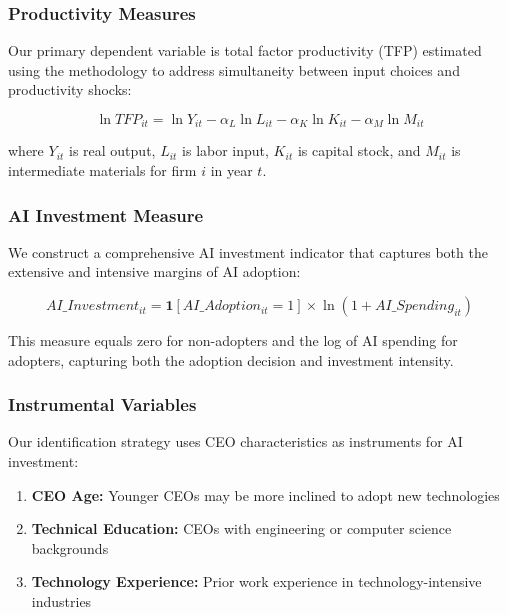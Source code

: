 \documentclass[12pt]{article}
\begin{document}
\subsubsection{Productivity Measures}

Our primary dependent variable is total factor productivity (TFP) estimated using the \citet{olley1996dynamics} methodology to address simultaneity between input choices and productivity shocks:

\begin{equation}
\ln TFP_{it} = \ln Y_{it} - \alpha_L \ln L_{it} - \alpha_K \ln K_{it} - \alpha_M \ln M_{it}
\end{equation}

where $Y_{it}$ is real output, $L_{it}$ is labor input, $K_{it}$ is capital stock, and $M_{it}$ is intermediate materials for firm $i$ in year $t$.

\subsubsection{AI Investment Measure}

We construct a comprehensive AI investment indicator that captures both the extensive and intensive margins of AI adoption:

\begin{equation}
AI\_Investment_{it} = \mathbf{1}[AI\_Adoption_{it} = 1] \times \ln(1 + AI\_Spending_{it})
\end{equation}

This measure equals zero for non-adopters and the log of AI spending for adopters, capturing both the adoption decision and investment intensity.

\subsubsection{Instrumental Variables}

Our identification strategy uses CEO characteristics as instruments for AI investment:

\begin{enumerate}
\item \textbf{CEO Age:} Younger CEOs may be more inclined to adopt new technologies
\item \textbf{Technical Education:} CEOs with engineering or computer science backgrounds
\item \textbf{Technology Experience:} Prior work experience in technology-intensive industries
\end{enumerate}
\end{document}

